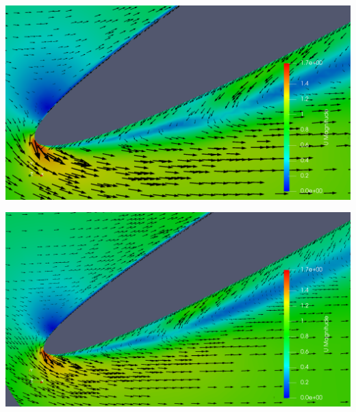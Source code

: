 \documentclass[a4paper,12pt]{article}
\begin{document}
\includegraphics[width=\textwidth]{images/turbulence/recirculation_vectorScaled.png} 

\includegraphics[width=\textwidth]{images/turbulence/recirculation_vectorScaled2.png} 
\end{document}
